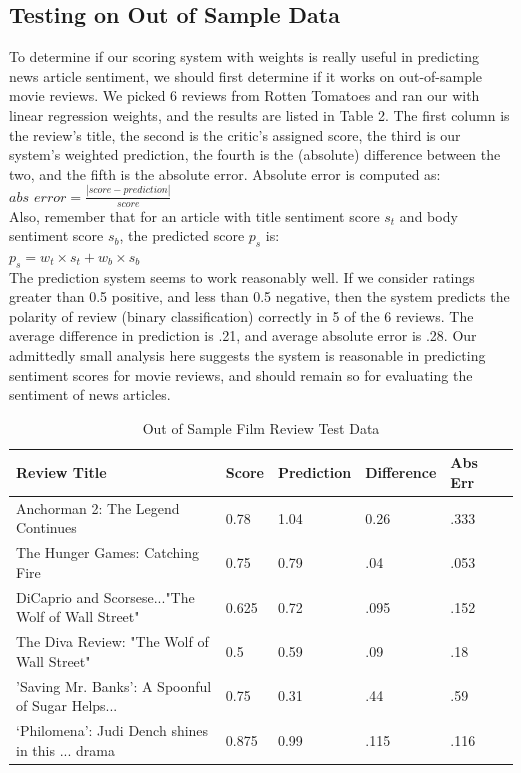 \documentclass[pageno]{jpaper}
\begin{document}
\subsection{Testing on Out of Sample Data}
To determine if our scoring system with weights is really useful in predicting news article sentiment, we should first determine if it works on out-of-sample movie reviews. We picked 6 reviews from Rotten Tomatoes and ran our with linear regression weights, and the results are listed in Table 2. The first column is the review's title, the second is the critic's assigned score, the third is our system's weighted prediction, the fourth is the (absolute) difference between the two, and the fifth is the absolute error. Absolute error is computed as: \\
\textit{$abs$ $error = \frac{|score-prediction|}{score}$} \\
Also, remember that for an article with title sentiment score $s_t$ and body sentiment score $s_b$, the predicted score $p_s$ is: \\
\textit{$p_s = w_t \times s_t + w_b \times s_b$} \\
\indent The prediction system seems to work reasonably well. If we consider ratings greater than 0.5 positive, and less than 0.5 negative, then the system predicts the polarity of review (binary classification) correctly in 5 of the 6 reviews. The average difference in prediction is .21, and average absolute error is .28. Our admittedly small analysis here suggests the system is reasonable in predicting sentiment scores for movie reviews, and should remain so for evaluating the sentiment of news articles.
\begin{table}
  \centering
    \begin{tabular}{| l | l | l | l | l | l |}
    \hline
    Review Title & Score & Prediction & Difference & Abs Err \\ \hline
    Anchorman 2: The Legend Continues & 0.78 & 1.04 & 0.26 &.333 \\ \hline
    The Hunger Games: Catching Fire & 0.75 & 0.79 & .04 & .053 \\ \hline
    DiCaprio and Scorsese..."The Wolf of Wall Street" & 0.625 & 0.72 & .095 & .152 \\ \hline
    The Diva Review: "The Wolf of Wall Street" & 0.5 & 0.59 & .09 & .18 \\ \hline
    'Saving Mr. Banks': A Spoonful of Sugar Helps... & 0.75 & 0.31 & .44 & .59 \\ \hline
    ‘Philomena’: Judi Dench shines in this ... drama & 0.875 & 0.99 & .115 & .116 \\ 
    \hline
  \end{tabular}
  \caption{Out of Sample Film Review Test Data}
  \label{table:formatting}
\end{table}
\end{document}
